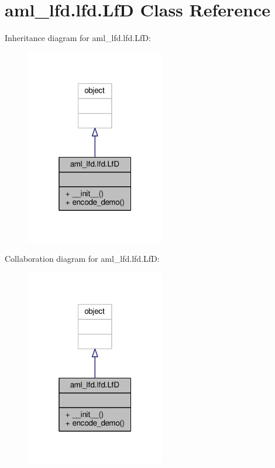 \hypertarget{classaml__lfd_1_1lfd_1_1_lf_d}{\section{aml\-\_\-lfd.\-lfd.\-Lf\-D Class Reference}
\label{classaml__lfd_1_1lfd_1_1_lf_d}
}


Inheritance diagram for aml\-\_\-lfd.\-lfd.\-Lf\-D\-:\nopagebreak
\begin{figure}[H]
\begin{center}
\leavevmode
\includegraphics[width=172pt]{classaml__lfd_1_1lfd_1_1_lf_d__inherit__graph}
\end{center}
\end{figure}


Collaboration diagram for aml\-\_\-lfd.\-lfd.\-Lf\-D\-:\nopagebreak
\begin{figure}[H]
\begin{center}
\leavevmode
\includegraphics[width=172pt]{classaml__lfd_1_1lfd_1_1_lf_d__coll__graph}
\end{center}
\end{figure}
